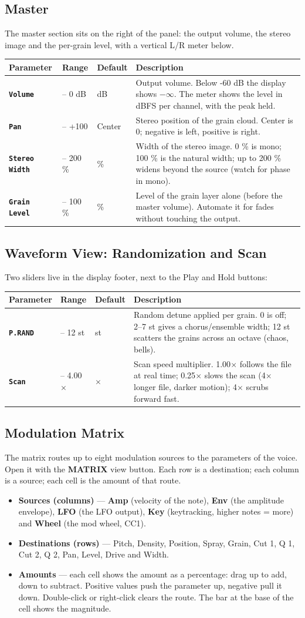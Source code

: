 \documentclass[11pt,a4paper]{article}
\makeatletter
\newcommand{\paramtable}[1]{%
  {\setlength{\tabcolsep}{3.5pt}\small
  \begin{tabular}{@{}>{\raggedright\arraybackslash}p{26mm}>{\raggedright\arraybackslash}p{25mm}>{\raggedright\arraybackslash}p{18mm}>{\raggedright\arraybackslash}p{\dimexpr\textwidth-69mm-21pt\relax}@{}}
  \toprule
  \textbf{Parameter} & \textbf{Range} & \textbf{Default} & \textbf{Description} \\
  \midrule
  #1
  \bottomrule
  \end{tabular}}}
\newcommand{\param}[4]{\texttt{\textbf{#1}} & #2 & #3 & #4 \\}
\makeatother
\begin{document}
\subsection{Master}
The master section sits on the right of the panel: the output volume, the
stereo image and the per-grain level, with a vertical L/R meter below.

\paramtable{
\param{Volume}{-60 -- 0 dB}{0 dB}{Output volume. Below -60 dB the display shows $-\infty$. The meter shows the level in dBFS per channel, with the peak held.}
\param{Pan}{-100 -- +100}{Center}{Stereo position of the grain cloud. Center is 0; negative is left, positive is right.}
\param{Stereo Width}{0 -- 200 \%}{100 \%}{Width of the stereo image. 0 \% is mono; 100 \% is the natural width; up to 200 \% widens beyond the source (watch for phase in mono).}
\param{Grain Level}{0 -- 100 \%}{100 \%}{Level of the grain layer alone (before the master volume). Automate it for fades without touching the output.}
}

\subsection{Waveform View: Randomization and Scan}
Two sliders live in the display footer, next to the Play and Hold buttons:

\paramtable{
\param{P.RAND}{0 -- 12 st}{0 st}{Random detune applied per grain. 0 is off; 2--7 st gives a chorus/ensemble width; 12 st scatters the grains across an octave (chaos, bells).}
\param{Scan}{0.25 -- 4.00$\times$}{1.00$\times$}{Scan speed multiplier. 1.00$\times$ follows the file at real time; 0.25$\times$ slows the scan (4$\times$ longer file, darker motion); 4$\times$ scrubs forward fast.}
}

\subsection{Modulation Matrix}
\label{sec:matrix}
The matrix routes up to eight modulation sources to the parameters of the
voice. Open it with the \textbf{MATRIX} view button. Each row is a
destination; each column is a source; each cell is the amount of that route.

\begin{itemize}
  \item \textbf{Sources (columns)} --- \textbf{Amp} (velocity of the note),
  \textbf{Env} (the amplitude envelope), \textbf{LFO} (the LFO output),
  \textbf{Key} (keytracking, higher notes = more) and \textbf{Wheel} (the
  mod wheel, CC1).
  \item \textbf{Destinations (rows)} --- Pitch, Density, Position, Spray,
  Grain, Cut 1, Q 1, Cut 2, Q 2, Pan, Level, Drive and Width.
  \item \textbf{Amounts} --- each cell shows the amount as a percentage: drag
  up to add, down to subtract. Positive values push the parameter up, negative
  pull it down. Double-click or right-click clears the route. The bar at the
  base of the cell shows the magnitude.
\end{itemize}
\end{document}
